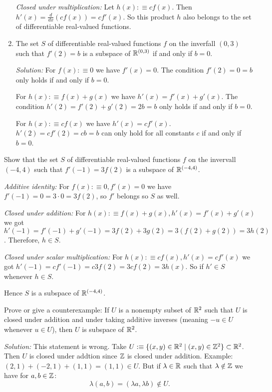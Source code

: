 \begin{enumerate}
{    \emph{Closed under multiplication:} Let $h(x) :\equiv c f(x)$. Then $h'(x) = \frac{d}{dx} (c f(x)) = c f'(x)$. So this product $h$ also belongs to the set of differentiable real-valued functions.
  }

  \item{
    The set $S$ of differentiable real-valued functions $f$ on the inverfall $(0,3)$ such that $f'(2) = b$ is a subspace of $\mathbb{R}^{(0,3)}$ if and only if $b=0$.

    \emph{Solution:} For $f(x) :\equiv 0$ we have $f'(x) = 0$. The condition $f'(2) =  0 = b$ only holds if and only if $b=0$.

    For $h(x) :\equiv f(x) + g(x)$ we have $h'(x) = f'(x) + g'(x)$. The condition $h'(2) = f'(2) + g'(2) = 2b = b$ only holds if and only if $b=0$.

    For $h(x) :\equiv cf(x)$ we have $h'(x) = cf'(x)$. $h'(2) = cf'(2) = cb = b$ can only hold for all constants $c$ if and only if $b=0$.
  }
\end{enumerate}

\begin{xrcs}
  Show that the set $S$ of differentiable real-valued functions $f$ on the invervall $(-4,4)$ such that $f'(-1) = 3f(2)$ is a subspace of $\mathbb{R}^{(-4,4)}$.

  \emph{Additive identity:} For $f(x) :\equiv 0, f'(x) = 0$ we have $f'(-1) = 0 = 3 \cdot 0 = 3f(2)$, so $f'$ belongs so $S$ as well.

  \emph{Closed under addition:} For $h(x) :\equiv f(x) + g(x), h'(x) = f'(x) + g'(x)$ we got $h'(-1) = f'(-1) + g'(-1) = 3f(2) + 3g(2) = 3(f(2)+g(2)) = 3h(2)$. Therefore, $h \in S$.

  \emph{Closed under scalar multiplication:} For $h(x) :\equiv cf(x), h'(x) = cf'(x)$ we got $h'(-1) = cf'(-1) = c3f(2) = 3cf(2) = 3h(x)$. So if $h' \in S$ whenever $h \in S$.

  Hence $S$ is a subspace of $\mathbb{R}^{(-4,4)}$.
\end{xrcs}

\setcounter{xrcs}{7}
\begin{xrcs}
  Prove or give a counterexample: If $U$ is a nonempty subset of $\mathbb{R}^2$ such that $U$ is closed under addition and under taking additive inverses (meaning $-u \in U$ whenever $u \in U$), then $U$ is subspace of $\mathbb{R}^2$.
\end{xrcs}

\emph{Solution:} This statement is wrong. Take $U :\equiv \{(x,y) \in \mathbb{R}^2 \mid (x,y) \in \mathbb{Z}^2 \} \subset \mathbb{R}^2$. Then $U$ is closed under addtion since $\mathbb{Z}$ is closed under addition. Example: $(2,1)+(-2,1)+(1,1) = (1,1) \in U$. But if $\lambda \in \mathbb{R}$ such that $\lambda \notin \mathbb{Z}$ we have for $a,b \in \mathbb{Z}$:
\[
  \lambda(a,b) = (\lambda a, \lambda b) \notin U.
\]

